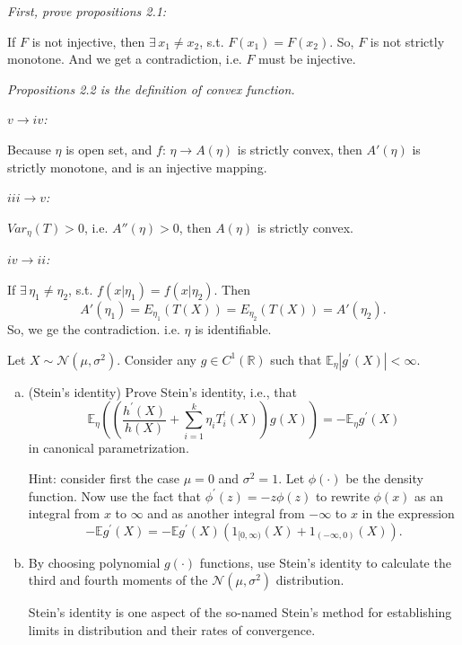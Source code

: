 \begin{solution}
    \emph{First, prove propositions 2.1: }

    If $F$ is not injective, then $\exists\, x_1\neq x_2$, s.t. $F(x_1)=F(x_2)$. So, $F$ is not strictly monotone. And we get a contradiction, i.e. $F$ must be injective. 

    \emph{Propositions 2.2 is the definition of convex function. }

    \emph{$v\to iv$: }

    Because $\eta$ is open set, and $f:\,\eta\to A(\eta)$ is strictly convex, then $A'(\eta)$ is strictly monotone, and is an injective mapping. 

    \emph{$iii\to v$: }

    $Var_\eta(T)>0$, i.e. $A''(\eta)>0$, then $A(\eta)$ is strictly convex. 

    \emph{$iv\to ii$: }

    If $\exists\,\eta_1\neq\eta_2$, s.t. $f(x|\eta_1)=f(x|\eta_2)$. Then 
    \[
        A'(\eta_1)=E_{\eta_1}(T(X))=E_{\eta_2}(T(X))=A'(\eta_2). 
    \]
    So, we ge the contradiction. i.e. $\eta$ is identifiable. 
\end{solution}

\begin{ex}
    Let \(X \sim \mathcal{N}\left(\mu, \sigma^{2}\right)\). Consider any \(g \in C^{1}(\mathbb{R})\) such that \(\mathbb{E}_{\eta}\left|g^{\prime}(X)\right|<\infty\). 
    \begin{enumerate}[(a)]
        \item (Stein's identity) Prove Stein's identity, i.e., that
        \[
        \mathbb{E}_{\eta}\left(\left(\frac{h^{\prime}(X)}{h(X)}+\sum_{i=1}^{k} \eta_{i} T_{i}^{\prime}(X)\right) g(X)\right)=-\mathbb{E}_{\eta} g^{\prime}(X)
        \]
        in canonical parametrization. 
        
        Hint: consider first the case \(\mu=0\) and \(\sigma^{2}=1\). Let \(\phi(\cdot)\) be the density function. Now use the fact that \(\phi^{\prime}(z)=-z \phi(z)\) to rewrite \(\phi(x)\) as an integral from \(x\) to \(\infty\) and as another integral from \(-\infty\) to \(x\) in the expression
        \[
            -\mathbb{E} g^{\prime}(X)=-\mathbb{E} g^{\prime}(X)\left(1_{[0, \infty)}(X)+1_{(-\infty, 0)}(X)\right). 
        \]
        \item By choosing polynomial \(g(\cdot)\) functions, use Stein's identity to calculate the third and fourth moments of the \(\mathcal{N}\left(\mu, \sigma^{2}\right)\) distribution.
        
         Stein's identity is one aspect of the so-named Stein's method for establishing limits in distribution and their rates of convergence.
    \end{enumerate}
\end{ex}


